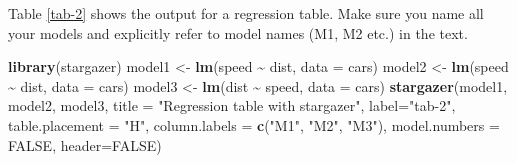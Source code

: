 \documentclass[
  12pt,
]{article}
\newenvironment{Shaded}{\begin{snugshade}}{\end{snugshade}}
\newcommand{\AttributeTok}[1]{\textcolor[rgb]{0.13,0.29,0.53}{#1}}
\newcommand{\ConstantTok}[1]{\textcolor[rgb]{0.56,0.35,0.01}{#1}}
\newcommand{\FunctionTok}[1]{\textcolor[rgb]{0.13,0.29,0.53}{\textbf{#1}}}
\newcommand{\NormalTok}[1]{#1}
\newcommand{\OtherTok}[1]{\textcolor[rgb]{0.56,0.35,0.01}{#1}}
\newcommand{\SpecialCharTok}[1]{\textcolor[rgb]{0.81,0.36,0.00}{\textbf{#1}}}
\newcommand{\StringTok}[1]{\textcolor[rgb]{0.31,0.60,0.02}{#1}}
\begin{document}
Table \ref{tab-2} shows the output for a regression table. Make sure you name all your models and explicitly refer to model names (M1, M2 etc.) in the text.

\begin{Shaded}
\begin{Highlighting}[]
\FunctionTok{library}\NormalTok{(stargazer)}
\NormalTok{model1 }\OtherTok{\textless{}{-}} \FunctionTok{lm}\NormalTok{(speed }\SpecialCharTok{\textasciitilde{}}\NormalTok{ dist, }\AttributeTok{data =}\NormalTok{ cars)}
\NormalTok{model2 }\OtherTok{\textless{}{-}} \FunctionTok{lm}\NormalTok{(speed }\SpecialCharTok{\textasciitilde{}}\NormalTok{ dist, }\AttributeTok{data =}\NormalTok{ cars)}
\NormalTok{model3 }\OtherTok{\textless{}{-}} \FunctionTok{lm}\NormalTok{(dist }\SpecialCharTok{\textasciitilde{}}\NormalTok{ speed, }\AttributeTok{data =}\NormalTok{ cars)}
\FunctionTok{stargazer}\NormalTok{(model1, model2, model3,}
          \AttributeTok{title =} \StringTok{"Regression table with stargazer"}\NormalTok{,}
          \AttributeTok{label=}\StringTok{"tab{-}2"}\NormalTok{, }
          \AttributeTok{table.placement =} \StringTok{"H"}\NormalTok{, }
          \AttributeTok{column.labels =} \FunctionTok{c}\NormalTok{(}\StringTok{"M1"}\NormalTok{, }\StringTok{"M2"}\NormalTok{, }\StringTok{"M3"}\NormalTok{),}
          \AttributeTok{model.numbers =} \ConstantTok{FALSE}\NormalTok{,}
          \AttributeTok{header=}\ConstantTok{FALSE}\NormalTok{)}
\end{Highlighting}
\end{Shaded}
\end{document}
